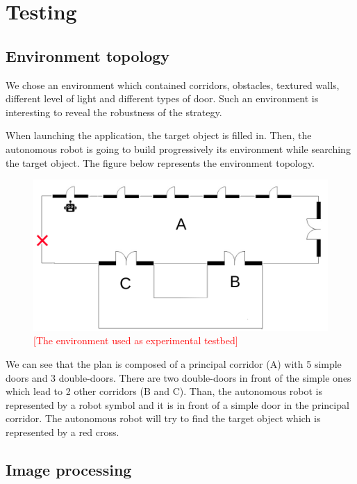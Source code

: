 \documentclass[12pt]{report}
\newcommand{\hc}[1]{\textcolor{red}{[#1]}}
\begin{document}
\newpage
	

	\chapter{Testing}
	\label{chap:testing}
	
	\section{Environment topology}
	We chose an environment which contained corridors, obstacles, textured walls, different level of light and different types of door. Such an environment is interesting to reveal the robustness of the strategy.
		
	When launching the application, the target object is filled in. Then, the autonomous robot is going to build 
progressively its environment while searching the target object. The figure below represents the environment topology.
	\begin{figure}[H]
		\begin{center}
			\includegraphics[scale=0.55]{res/plan.png}
			\caption{\hc{The environment used as experimental testbed}}
		\end{center}
	\end{figure}
	
	We can see that the plan is composed of a principal corridor (A) with 5 simple doors and 3 double-doors. There are two double-doors in front of the simple ones which lead to 2 other corridors (B and C). Than, the autonomous robot is represented by a robot symbol and it is in front of a simple door in the principal corridor. The autonomous robot will try to find the target object which is represented by a red cross.

	\section{Image processing}
	
\end{document}
